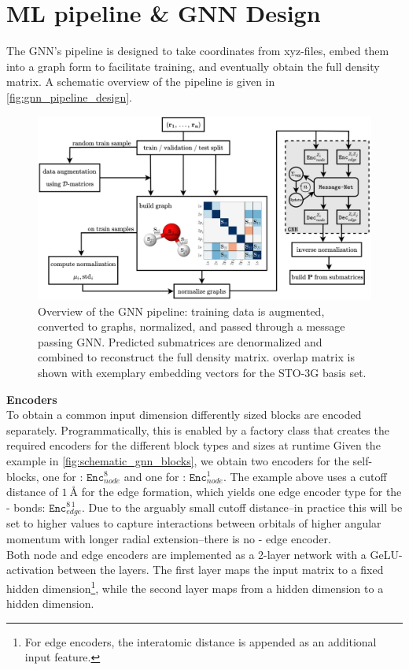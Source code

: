 \section{ML pipeline \& GNN Design}
\label{sec:gnn_design}
The GNN's pipeline is designed to take coordinates from xyz-files, embed them into a graph form to facilitate training, and eventually obtain the full density matrix. A schematic overview of the pipeline is given in \autoref{fig:gnn_pipeline_design}.
\begin{figure}[H]
    \centering
    \includegraphics[width=\textwidth]{../fig/gnn/GNN_design.pdf}
    \caption[GNN pipeline design]{Overview of the GNN pipeline: training data is augmented, converted to graphs, normalized, and passed through a message passing GNN. Predicted submatrices are denormalized and combined to reconstruct the full density matrix.  overlap matrix is shown with exemplary embedding vectors for the STO-3G basis set.}
    \label{fig:gnn_pipeline_design}
\end{figure}
\textbf{Encoders}\\
To obtain a common input dimension differently sized blocks are encoded separately. Programmatically, this is enabled by a factory class that creates the required encoders for the different block types and sizes at runtime Given the  example in \autoref{fig:schematic_gnn_blocks}, we obtain two encoders for the self-blocks, one for : $\texttt{Enc}^{8}_{node}$ and one for : $\texttt{Enc}^{1}_{node}$. The example above uses a cutoff distance of $\SI{1}{\angstrom}$ for the edge formation, which yields one edge encoder type for the - bonds: $\texttt{Enc}^{8\,1}_{edge}$. Due to the arguably small cutoff distance--in practice this will be set to higher values to capture interactions between orbitals of higher angular momentum with longer radial extension--there is no - edge encoder. \\
Both node and edge encoders are implemented as a 2-layer network with a GeLU-activation between the layers. The first layer maps the input matrix to a fixed hidden dimension\footnote{For edge encoders, the interatomic distance is appended as an additional input feature.}, while the second layer maps from a hidden dimension to a hidden dimension. 

